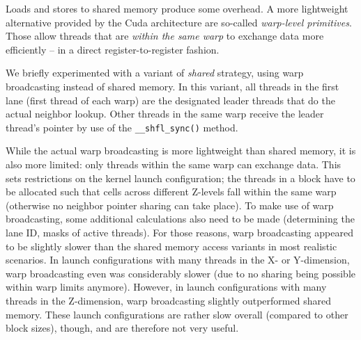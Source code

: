 
Loads and stores to shared memory produce some overhead. A more lightweight alternative provided by the Cuda architecture are so-called \emph{warp-level primitives}. Those allow threads that are \emph{within the same warp} to exchange data more efficiently -- in a direct register-to-register fashion.

We briefly experimented with a variant of \emph{shared} strategy, using warp broadcasting instead of shared memory. In this variant, all threads in the first lane (first thread of each warp) are the designated leader threads that do the actual neighbor lookup. Other threads in the same warp receive the leader thread's pointer by use of the \texttt{\_\_shfl\_sync()} method.

While the actual warp broadcasting is more lightweight than shared memory, it is also more limited: only threads within the same warp can exchange data. This sets restrictions on the kernel launch configuration; the threads in a block have to be allocated such that cells across different Z-levels fall within the same warp (otherwise no neighbor pointer sharing can take place). To make use of warp broadcasting, some additional calculations also need to be made (determining the lane ID, masks of active threads). For those reasons, warp broadcasting appeared to be slightly slower than the shared memory access variants in most realistic scenarios. In launch configurations with many threads in the X- or Y-dimension, warp broadcasting even was considerably slower (due to no sharing being possible within warp limits anymore). However, in launch configurations with many threads in the Z-dimension, warp broadcasting slightly outperformed shared memory. These launch configurations are rather slow overall (compared to other block sizes), though, and are therefore not very useful.

